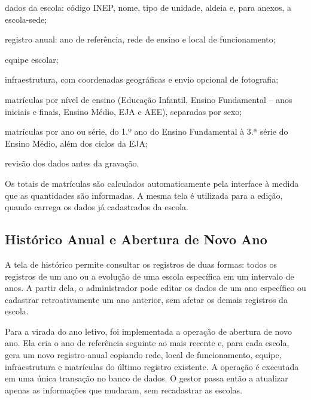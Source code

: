 \begin{alineas}
  \item dados da escola: código INEP, nome, tipo de unidade, aldeia e, para anexos, a escola-sede;
  \item registro anual: ano de referência, rede de ensino e local de funcionamento;
  \item equipe escolar;
  \item infraestrutura, com coordenadas geográficas e envio opcional de fotografia;
  \item matrículas por nível de ensino (Educação Infantil, Ensino Fundamental -- anos iniciais e finais, Ensino Médio, EJA e AEE), separadas por sexo;
  \item matrículas por ano ou série, do 1.º ano do Ensino Fundamental à 3.ª série do Ensino Médio, além dos ciclos da EJA;
  \item revisão dos dados antes da gravação.
\end{alineas}

Os totais de matrículas são calculados automaticamente pela interface à medida que as quantidades são informadas. A mesma tela é utilizada para a edição, quando carrega os dados já cadastrados da escola.


\subsection{Histórico Anual e Abertura de Novo Ano}

A tela de histórico permite consultar os registros de duas formas: todos os registros de um ano ou a evolução de uma escola específica em um intervalo de anos. A partir dela, o administrador pode editar os dados de um ano específico ou cadastrar retroativamente um ano anterior, sem afetar os demais registros da escola.

Para a virada do ano letivo, foi implementada a operação de abertura de novo ano. Ela cria o ano de referência seguinte ao mais recente e, para cada escola, gera um novo registro anual copiando rede, local de funcionamento, equipe, infraestrutura e matrículas do último registro existente. A operação é executada em uma única transação no banco de dados. O gestor passa então a atualizar apenas as informações que mudaram, sem recadastrar as escolas.

